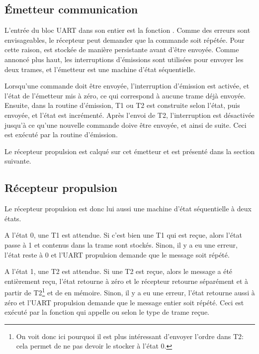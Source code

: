 \subsection{\'Emetteur communication}
L'entrée du bloc UART dans son entier est la fonction . Comme des erreurs sont envisageables, le récepteur peut demander que la commande soit répétée. Pour cette raison,  est stockée de manière persistante avant d'être envoyée. Comme annoncé plus haut, les interruptions d'émissions sont utilisées pour envoyer les deux trames, et l'émetteur est une machine d'état séquentielle.

Lorsqu'une commande doit être envoyée, l'interruption d'émission est activée, et l'état de l'émetteur mis à zéro, ce qui correspond à aucune trame déjà envoyée. Ensuite, dans la routine d'émission, T1 ou T2 est construite selon l'état, puis envoyée, et l'état est incrémenté. Après l'envoi de T2, l'interruption est désactivée jusqu'à ce qu'une nouvelle commande doive être envoyée, et ainsi de suite. Ceci est exécuté par la routine d'émission.

Le récepteur propulsion est calqué sur cet émetteur et est présenté dans la section suivante.

\subsection{Récepteur propulsion\label{subsec:propReceptor}}
Le récepteur propulsion est donc lui aussi une machine d'état séquentielle à deux états.

A l'état 0, une T1 est attendue. Si c'est bien une T1 qui est reçue, alors l'état passe à 1 et  contenus dans la trame sont stockés. Sinon, il y a eu une erreur, l'état reste à 0 et l'UART propulsion demande que le message soit répété.

A l'état 1, une T2 est attendue. Si une T2 est reçue, alors le message a été entièrement reçu, l'état retourne à zéro et le récepteur retourne séparément  et  à partir de T2\footnote{On voit donc ici pourquoi il est plus intéressant d'envoyer l'ordre dans T2: cela permet de ne pas devoir le stocker à l'état 0.} et de  en mémoire. Sinon, il y a eu une erreur, l'état retourne aussi à zéro et l'UART propulsion demande que le message entier soit répété. Ceci est exécuté par la fonction  qui appelle  ou  selon le type de trame reçue.

